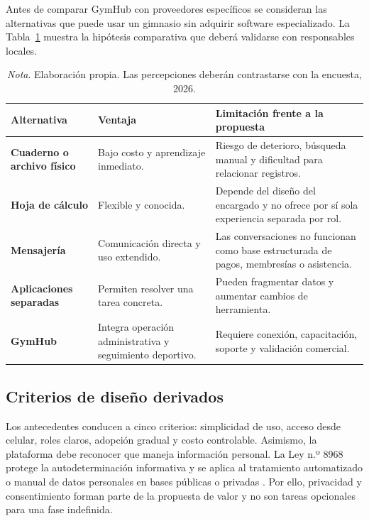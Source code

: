 Antes de comparar GymHub con proveedores específicos se consideran las
alternativas que puede usar un gimnasio sin adquirir software especializado. La
Tabla~\ref{tab:alternativas} muestra la hipótesis comparativa que deberá validarse
con responsables locales.

\begin{table}[H]
\caption{Comparación preliminar con alternativas de gestión}
\label{tab:alternativas}
\begin{tabularx}{\textwidth}{>{\bfseries}p{2.8cm}X X}
\toprule
Alternativa & Ventaja & Limitación frente a la propuesta \\
\midrule
Cuaderno o archivo físico & Bajo costo y aprendizaje inmediato. & Riesgo de deterioro, búsqueda manual y dificultad para relacionar registros. \\
Hoja de cálculo & Flexible y conocida. & Depende del diseño del encargado y no ofrece por sí sola experiencia separada por rol. \\
Mensajería & Comunicación directa y uso extendido. & Las conversaciones no funcionan como base estructurada de pagos, membresías o asistencia. \\
Aplicaciones separadas & Permiten resolver una tarea concreta. & Pueden fragmentar datos y aumentar cambios de herramienta. \\
GymHub & Integra operación administrativa y seguimiento deportivo. & Requiere conexión, capacitación, soporte y validación comercial. \\
\bottomrule
\end{tabularx}
\caption*{\textit{Nota}. Elaboración propia. Las percepciones deberán contrastarse con la encuesta, 2026.}
\end{table}

\subsection{Criterios de diseño derivados}

Los antecedentes conducen a cinco criterios: simplicidad de uso, acceso desde
celular, roles claros, adopción gradual y costo controlable. Asimismo, la
plataforma debe reconocer que maneja información personal. La Ley n.º 8968
protege la autodeterminación informativa y se aplica al tratamiento automatizado
o manual de datos personales en bases públicas o privadas
\parencite{ley8968}. Por ello, privacidad y consentimiento forman parte de la
propuesta de valor y no son tareas opcionales para una fase indefinida.
